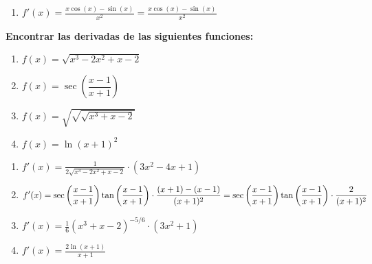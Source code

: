 \documentclass[answers]{exam} %
\begin{document}
\begin{questions}
\begin{solution}
\begin{enumerate}[label=\alph*.]
            \item $\displaystyle f'(x) =  \frac{x \cos(x) - \sin(x)}{x^2} = \frac{x \cos(x) - \sin(x)}{x^2}$\\
        \end{enumerate}
    \end{solution}
    \vspace{0.5cm}
    \newpage
    \question \large\textbf{Encontrar las derivadas de las siguientes funciones:}
    \begin{enumerate}[label=\alph*.]
        \item $\displaystyle f(x)=\sqrt{x^3-2x^2+x-2}$
        \item $\displaystyle f(x)=\sec\left(\dfrac{x-1}{x+1}\right)$
        \item $\displaystyle f(x)=\sqrt{\sqrt{\sqrt{x^3+x-2}}}$
        \item $\displaystyle f(x)=\ln(x+1)^2$
    \end{enumerate}
    \begin{solution}
        \begin{enumerate}[label=\alph*.]
            \item $\displaystyle f'(x) =  \frac{1}{2\sqrt{x^3-2x^2+x-2}} \cdot (3x^2-4x+1)$\\
            \item $\displaystyle f'(x) =  \sec\left(\frac{x-1}{x+1}\right) \tan\left(\frac{x-1}{x+1}\right) \cdot \frac{(x+1) - (x-1)}{(x+1)^2}\\ = \sec\left(\frac{x-1}{x+1}\right) \tan\left(\frac{x-1}{x+1}\right) \cdot \frac{2}{(x+1)^2}$\\
            \item $\displaystyle f'(x) =  \frac{1}{6} (x^3+x-2)^{-5/6} \cdot (3x^2+1)$\\
            \item $\displaystyle f'(x) = \frac{2\ln(x+1)}{x+1}$\\
        \end{enumerate}
    \end{solution}
    

    \vspace{0.5cm}


\end{questions}
\end{document}
